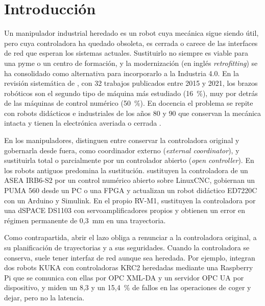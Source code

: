 \section{Introducción}\label{sec:intro}

Un manipulador industrial heredado es un robot cuya mecánica sigue siendo útil, pero cuya controladora ha quedado obsoleta, es cerrada o carece de las interfaces de red que esperan los sistemas actuales. Sustituirlo no siempre es viable para una pyme o un centro de formación, y la modernización (en inglés \textit{retrofitting}) se ha consolidado como alternativa para incorporarlo a la Industria 4.0. En la revisión sistemática de \citet{alqoud2022industry}, con 32 trabajos publicados entre 2015 y 2021, los brazos robóticos son el segundo tipo de máquina más estudiado (16~\%), muy por detrás de las máquinas de control numérico (50~\%). En docencia el problema se repite con robots didácticos e industriales de los años 80 y 90 que conservan la mecánica intacta y tienen la electrónica averiada o cerrada \citep{conchasanchez2020recycling,roldan2018enhancing}.

En los manipuladores, \citet{bilancia2023overview} distinguen entre conservar la controladora original y gobernarla desde fuera, como coordinador externo (\textit{external coordinator}), y sustituirla total o parcialmente por un controlador abierto (\textit{open controller}). En los robots antiguos predomina la sustitución.\citet{alvares2018retrofitting} sustituyen la controladora de un ASEA IRB6-S2 por un control numérico abierto sobre LinuxCNC, \citet{jokic2020two} gobiernan un PUMA 560 desde un PC o una FPGA y \citet{conchasanchez2020recycling} actualizan un robot didáctico ED7220C con un Arduino y Simulink. En el propio RV-M1, \citet{roldan2018enhancing} sustituyen la controladora por una dSPACE DS1103 con servoamplificadores propios y obtienen un error en régimen permanente de 0,3~mm en una trayectoria.

Como contrapartida, abrir el lazo obliga a renunciar a la controladora original, a su planificación de trayectorias y a sus seguridades. Cuando la controladora se conserva, suele tener interfaz de red aunque sea heredada. Por ejemplo, \citet{holmes2025retrofitting} integran dos robots KUKA con controladoras KRC2 heredadas mediante una Raspberry Pi que se comunica con ellas por OPC XML-DA y un servidor OPC UA por dispositivo, y miden un 8,3 y un 15,4~\% de fallos en las operaciones de coger y dejar, pero no la latencia.

